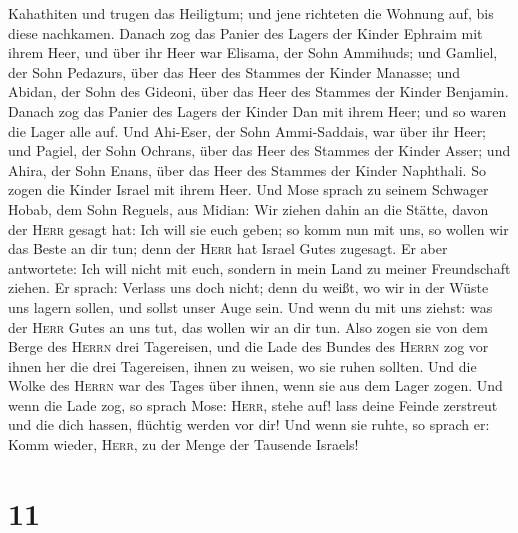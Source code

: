 Kahathiten und trugen das Heiligtum; und jene richteten die Wohnung auf,
bis diese nachkamen.  Danach zog das Panier des Lagers
der Kinder Ephraim mit ihrem Heer, und über ihr Heer war Elisama, der
Sohn Ammihuds;  und Gamliel, der Sohn Pedazurs, über das
Heer des Stammes der Kinder Manasse;  und Abidan, der
Sohn des Gideoni, über das Heer des Stammes der Kinder Benjamin.
 Danach zog das Panier des Lagers der Kinder Dan mit
ihrem Heer; und so waren die Lager alle auf. Und Ahi-Eser, der Sohn
Ammi-Saddais, war über ihr Heer;  und Pagiel, der Sohn
Ochrans, über das Heer des Stammes der Kinder Asser;  und
Ahira, der Sohn Enans, über das Heer des Stammes der Kinder Naphthali.
 So zogen die Kinder Israel mit ihrem Heer.
 Und Mose sprach zu seinem Schwager Hobab, dem Sohn
Reguels, aus Midian: Wir ziehen dahin an die Stätte, davon der
\textsc{Herr} gesagt hat: Ich will sie euch geben; so komm nun mit uns,
so wollen wir das Beste an dir tun; denn der \textsc{Herr} hat Israel
Gutes zugesagt.  Er aber antwortete: Ich will nicht mit
euch, sondern in mein Land zu meiner Freundschaft ziehen.
 Er sprach: Verlass uns doch nicht; denn du weißt, wo wir
in der Wüste uns lagern sollen, und sollst unser Auge sein.
 Und wenn du mit uns ziehst: was der \textsc{Herr} Gutes
an uns tut, das wollen wir an dir tun.  Also zogen sie
von dem Berge des \textsc{Herrn} drei Tagereisen, und die Lade des
Bundes des \textsc{Herrn} zog vor ihnen her die drei Tagereisen, ihnen
zu weisen, wo sie ruhen sollten.  Und die Wolke des
\textsc{Herrn} war des Tages über ihnen, wenn sie aus dem Lager zogen.
 Und wenn die Lade zog, so sprach Mose: \textsc{Herr},
stehe auf! lass deine Feinde zerstreut und die dich hassen, flüchtig
werden vor dir!  Und wenn sie ruhte, so sprach er: Komm
wieder, \textsc{Herr}, zu der Menge der Tausende Israels!

\hypertarget{section-10}{%
\section{11}\label{section-10}}


